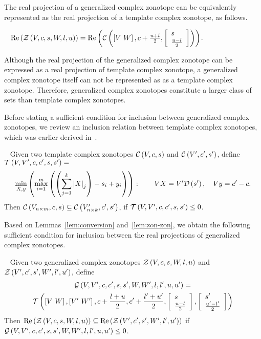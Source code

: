 


The real projection of a generalized complex zonotope can be
equivalently represented as the real projection of a template complex
zonotope, as follows.  
\begin{lemma}~\label{lem:conversion}
$\real\lt(\gcz{V}{c}{s}{W}{l}{u}\rt) = \real\lt(\cz{\lt[V~W\rt]}{c+\frac{u+l}{2}}{\ColumnJoin{s}{\frac{u-l}{2}}}\rt)$.
\end{lemma}
Although the real projection of the generalized complex zonotope can
be expressed as a real projection of template complex zonotope, a
generalized complex zonotope itself can not be represented as as a
template complex zonotope.  Therefore, generalized complex zonotopes
constitute a larger class of sets than template complex zonotopes.

Before stating a sufficient condition for inclusion between generalized complex
zonotopes, we review an inclusion relation between template complex
zonotopes, which was earlier derived in~\cite{todo}.
\begin{lemma}~\label{lem:zon-zon} Given two template complex zonotopes
  $\cz{V}{c}{s}$ and $\cz{V^\pr}{c^\pr}{s^\pr}$, define
  $\IncTcz{V}{V^\pr}{c}{c^\pr}{s}{s^\pr} = $
\begin{align}
\begin{split}
\min_{X,y}\lt(\scalebound{X}{y}{s}{m}{k}\rt):~~~~~~\transfer{V}{V^\pr}{s^\pr}{X},~~~\centertransfer{V}{c}{c^\pr}{y}.\\
\end{split}
\end{align}
Then $\cz{V_{n\times m}}{c}{s}\subseteq \cz{V_{n\times
    k}^\pr}{c^\pr}{s^\pr}$, if $\IncTcz{V}{V^\pr}{c}{c^\pr}{s}{s^\pr}\leq
0$.
\end{lemma}

Based on Lemmas~\ref{lem:conversion} and~\ref{lem:zon-zon}, we obtain
the following sufficient condition for inclusion between the real
projections of generalized complex zonotopes.
\begin{lemma}~\label{lem:gcz-gcz}
Given two generalized complex zonotopes $\gcz{V}{c}{s}{W}{l}{u}$ and
$\gcz{V^\pr}{c^\pr}{s^\pr}{W^\pr}{l^\pr}{u^\pr}$, define 
\begin{multline}
\IncGcz{V,V^\pr}{c,c^\pr}{s,s^\pr}{W,W^\pr}{l,l^\pr}{u,u^\pr} = \\
\IncTcz{\lt[V~W\rt]}{\lt[V^\pr~W^\pr\rt]}{c+\frac{l+u}{2}}{c^\pr+\frac{l^\pr+u^\pr}{2}}{\ColumnJoin{s}{\frac{u-l}{2}}}{\ColumnJoin{s^\pr}{\frac{u^\pr-l^\pr}{2}}}
\end{multline}
Then  $\real\lt(\gcz{V}{c}{s}{W}{l}{u}\rt) \subseteq
\real\lt(\gcz{V^\pr}{c^\pr}{s^\pr}{W^\pr}{l^\pr}{u^\pr}\rt)$ if\\
$\IncGcz{V,V^\pr}{c,c^\pr}{s,s^\pr}{W,W^\pr}{l,l^\pr}{u,u^\pr}\leq 0$.
\end{lemma}

